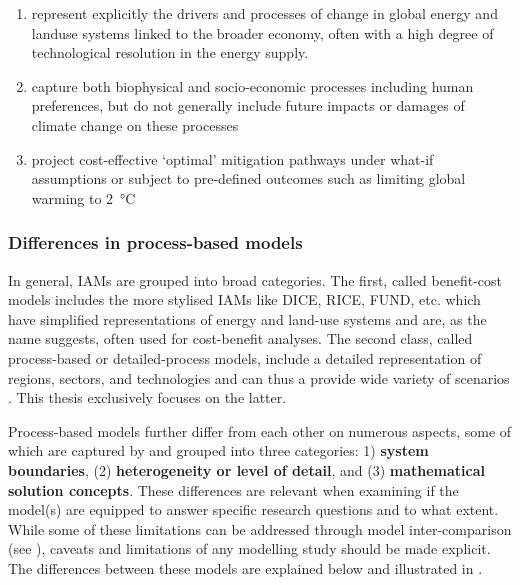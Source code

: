 \documentclass[../thesis.tex]{subfiles}
\begin{document}
\begin{enumerate}
\item represent explicitly the drivers and processes of change in global energy and landuse systems linked to the broader economy, often with a high degree of technological resolution in the energy supply.
\item capture both biophysical and socio-economic processes including human preferences, but do not generally include future impacts or damages of climate change on these processes
\item project cost-effective `optimal' mitigation pathways under what-if assumptions or subject to pre-defined outcomes such as limiting global warming to \SI{2}{\degreeCelsius} \citep{sathaye2013methods}
\end{enumerate}

\subsubsection{Differences in process-based models}
In general, IAMs are grouped into broad categories. The first, called benefit-cost models includes the more stylised IAMs like DICE, RICE, FUND, etc. which have simplified representations of energy and land-use systems and are, as the name suggests, often used for cost-benefit analyses. The second class, called process-based or detailed-process models, include a  detailed representation of regions, sectors, and technologies and can thus a provide wide variety of scenarios \citep{weyant2017}. This thesis exclusively focuses on the latter. 

Process-based models further differ from each other on numerous aspects, some of which are captured by \citet{krey2014} and grouped into three categories: 1) \textbf{system boundaries}, (2) \textbf{heterogeneity or level of detail}, and (3) \textbf{mathematical solution concepts}. These differences are relevant when examining if the model(s) are equipped to answer specific research questions and to what extent. While some of these limitations can be addressed through model inter-comparison (see ), caveats and limitations of any modelling study should be made explicit. The differences between these models are explained below and illustrated in .
\end{document}
